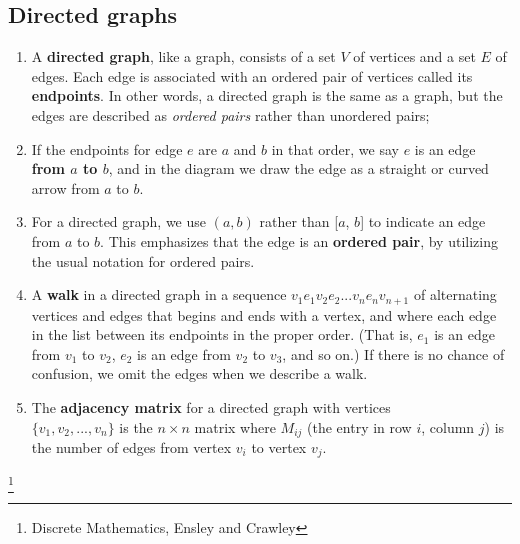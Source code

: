 \documentclass[a4paper,12pt]{book}
\begin{document}
\notonkey{ \newpage }{ \hrulefill }

    \subsection{Directed graphs}

    \begin{introNOHEAD}{}
        \begin{enumerate}
            \item   A \textbf{directed graph}, like a graph, consists of
                    a set $V$ of vertices and a set $E$ of edges.
                    Each edge is associated with an ordered pair of
                    vertices called its \textbf{endpoints}.
                    In other words, a directed graph is the same as a graph,
                    but the edges are described as \textit{ordered pairs}
                    rather than unordered pairs;

            \item   If the endpoints for edge $e$ are $a$ and $b$ in that order,
                    we say $e$ is an edge \textbf{from $a$ to $b$}, and
                    in the diagram we draw the edge as a straight or curved
                    arrow from $a$ to $b$.

            \item   For a directed graph, we use $(a,b)$ rather than
                    [$a$, $b$] to indicate an edge from $a$ to $b$.
                    This emphasizes that the edge is an \textbf{ordered pair},
                    by utilizing the usual notation for ordered pairs.

            \item   A \textbf{walk} in a directed graph in a sequence
                    $v_{1}e_{1} v_{2}e_{2} ... v_{n}e_{n} v_{n+1}$
                    of alternating vertices and edges that begins and
                    ends with a vertex, and where each edge in the
                    list between its endpoints in the proper order.
                    (That is, $e_{1}$ is an edge from $v_{1}$ to $v_{2}$,
                    $e_{2}$ is an edge from $v_{2}$ to $v_{3}$, and so on.)
                    If there is no chance of confusion, we omit the
                    edges when we describe a walk.

            \item   The \textbf{adjacency matrix} for a directed graph
                    with vertices \\ $\{ v_{1}, v_{2}, ..., v_{n} \}$ is
                    the $n \times n$ matrix where $M_{ij}$ (the entry
                    in row $i$, column $j$) is the number of edges
                    from vertex $v_{i}$ to vertex $v_{j}$.
        \end{enumerate}
        \footnote{Discrete Mathematics, Ensley and Crawley}
    \end{introNOHEAD}
\end{document}
